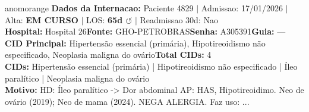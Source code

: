 \documentclass[a4paper,10pt]{article}
\begin{document}
\begin{anomalycard}[Internacao 162201 | GHO-PETROBRAS | ALTO (z=4.53)]{anomorange}
\textbf{Dados da Internacao:} Paciente 4829 $\mid$ Admissao: 17/01/2026 $\mid$ Alta: \textcolor{anomorange}{\textbf{EM CURSO}} $\mid$ LOS: \textbf{65d \textcolor{anomorange}{$\circlearrowleft$}} $\mid$ Readmissao 30d: Nao\\
\textbf{Hospital:} Hospital 26\quad\textbf{Fonte:} GHO-PETROBRAS\quad\textbf{Senha:} A305391\quad\textbf{Guia:} ---\\
\textbf{CID Principal:} {\small Hipertensão essencial (primária), Hipotireoidismo não especificado, Neoplasia maligna do ovário}\quad\textbf{Total CIDs:} 4\\

\textbf{CIDs:} {\scriptsize Hipertensão essencial (primária) | Hipotireoidismo não especificado | Íleo paralítico | Neoplasia maligna do ovário}\\

\textbf{Motivo:} {\scriptsize HD: Íleo paralítico -> Dor abdominal  AP: HAS, Hipotireoidimo. Neo de ovário (2019); Neo de mama (2024). NEGA ALERGIA. Faz uso: ...}\\


\end{anomalycard}
\end{document}
